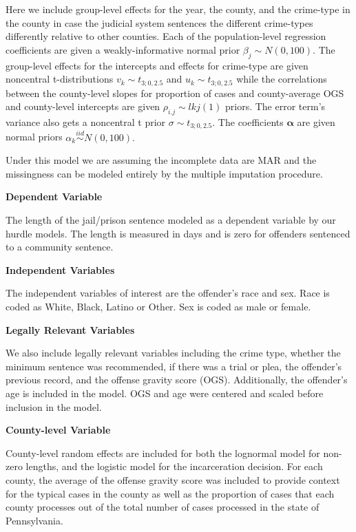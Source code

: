 \documentclass[
  letterpaper,
  DIV=11,
  numbers=noendperiod]{scrartcl}
\begin{document}
Here we include group-level effects for the year, the county, and the
crime-type in the county in case the judicial system sentences the
different crime-types differently relative to other counties. Each of
the population-level regression coefficients are given a
weakly-informative normal prior \(\beta_j \sim N(0, 100).\) The
group-level effects for the intercepts and effects for crime-type are
given noncentral t-distributions \(v_k \sim t_{3; 0, 2.5}\) and
\(u_k \sim t_{3; 0, 2.5}\) while the correlations between the
county-level slopes for proportion of cases and county-average OGS and
county-level intercepts are given \(\rho_{i.j} \sim lkj(1)\) priors. The
error term's variance also gets a noncentral t prior
\(\sigma \sim t_{3; 0, 2.5}.\) The coefficients \(\boldsymbol{\alpha}\)
are given normal priors \(\alpha_k \overset{iid}{\sim} N(0, 100).\)

Under this model we are assuming the incomplete data are MAR and the
missingness can be modeled entirely by the multiple imputation
procedure.

\textbf{Dependent Variable}

The length of the jail/prison sentence modeled as a dependent variable
by our hurdle models. The length is measured in days and is zero for
offenders sentenced to a community sentence.

\textbf{Independent Variables}

The independent variables of interest are the offender's race and sex.
Race is coded as White, Black, Latino or Other. Sex is coded as male or
female.

\textbf{Legally Relevant Variables}

We also include legally relevant variables including the crime type,
whether the minimum sentence was recommended, if there was a trial or
plea, the offender's previous record, and the offense gravity score
(OGS). Additionally, the offender's age is included in the model. OGS
and age were centered and scaled before inclusion in the model.

\textbf{County-level Variable}

County-level random effects are included for both the lognormal model
for non-zero lengths, and the logistic model for the incarceration
decision. For each county, the average of the offense gravity score was
included to provide context for the typical cases in the county as well
as the proportion of cases that each county processes out of the total
number of cases processed in the state of Pennsylvania.
\end{document}
